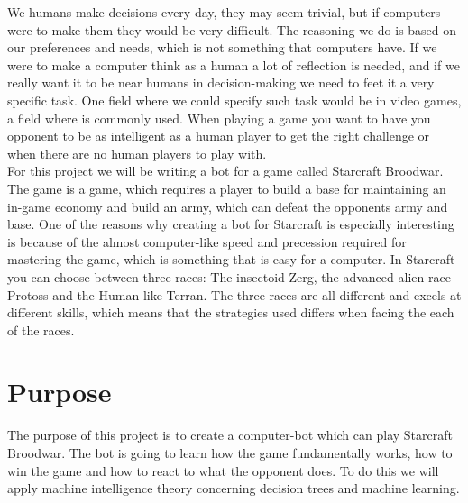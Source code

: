	We humans make decisions every day, they may seem trivial, but if computers were to make them they would be very difficult. The reasoning we do 
	is based on our preferences and needs, which is not something that computers have. 
	If we were to make a computer think as a human a lot of reflection is needed, and if we really want it to be near humans in decision-making we need 
	to feet it a very specific task. One field where we could specify such task would be in video games, a field where \abai is commonly used. When playing 
	a game you want to have you opponent to be as intelligent as a human player to get the right challenge or when there are no 
	human players to play with. \\
	
	For this project we will be writing a bot for a game called Starcraft Broodwar. The game is a \abrts game, which requires a player to build a base for maintaining an in-game economy and build an army, 
	which can defeat the opponents army and base. One of the reasons why creating a bot for Starcraft is 
	especially interesting is because of the almost computer-like speed and precession required for mastering the game, 
	which is something that is easy for a computer. 
	In Starcraft you can choose between three races: The insectoid Zerg, the advanced alien race Protoss and the Human-like Terran. 
	The three races are all different and excels at different skills, which means that the strategies used differs when 
	facing the each of the races. 


\section{Purpose}
	The purpose of this project is to create a computer-bot which can play Starcraft Broodwar. 
	The bot is going to learn how the game fundamentally works, 
	how to win the game and how to react to what the opponent does. 
	To do this we will apply machine intelligence theory concerning decision trees and machine learning.


